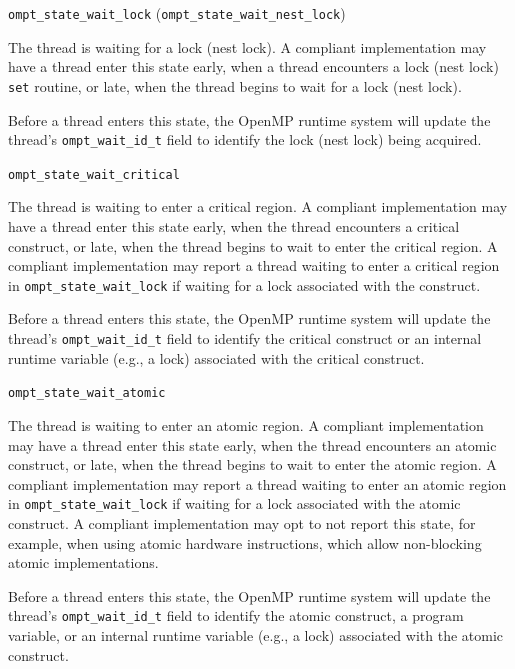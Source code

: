 \documentclass{article}
\newcommand{\descheader}[1]{{\needspace{3\baselineskip}\vspace{1em}\noindent \fbox{#1}}}
\begin{document}
\descheader{Mutex Wait States}

\begin{description}

\item \verb|ompt_state_wait_lock| (\verb|ompt_state_wait_nest_lock|)

  The thread is waiting for a  lock (nest lock). A compliant implementation
  may have a thread enter this state early, when a thread
  encounters a lock (nest lock) \verb|set| routine, or late, when the thread
  begins to wait for a lock (nest lock).

  Before a thread enters this state, the OpenMP runtime system will
  update the thread's \verb|ompt_wait_id_t| field to identify the lock (nest lock) being acquired.

\item \verb|ompt_state_wait_critical| 

  The thread is waiting to enter a critical region. A compliant
  implementation may have a thread enter this state early, when the
  thread encounters a critical construct, or late, when the thread
  begins to wait to enter the critical region. A compliant
  implementation may report a thread waiting to enter a critical
  region in \verb|ompt_state_wait_lock| if waiting for a lock associated with the construct.

  Before a thread enters this state, the OpenMP runtime system will
  update the thread's \verb|ompt_wait_id_t| field to identify the critical construct or an internal runtime variable (e.g., a lock) associated with the critical construct.

\item \verb|ompt_state_wait_atomic| 

  The thread is waiting to enter an atomic region. A compliant
  implementation may have a thread enter this state early, when the thread
  encounters an atomic construct, or late, when the thread begins
  to wait to enter the atomic region. A compliant
  implementation may report a thread waiting to enter an atomic
  region in \verb|ompt_state_wait_lock| if waiting for a lock associated with the atomic construct.
  A compliant implementation may opt to not report
  this state, for example, when using atomic hardware instructions, which allow non-blocking atomic implementations.

  Before a thread enters this state, the OpenMP runtime system will
  update the thread's \verb|ompt_wait_id_t| field to identify the atomic construct, a program variable, or an internal runtime variable (e.g., a lock) associated with the atomic construct.



\end{description}
\end{document}
